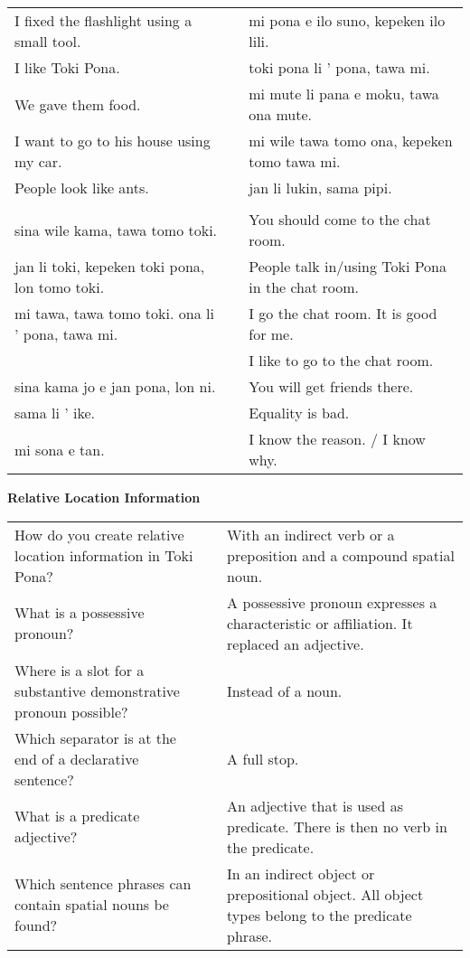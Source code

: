 \begin{supertabular}{p{5,5cm}|ll}
I fixed the flashlight using a small tool.  && mi pona e ilo suno, kepeken ilo lili. \\ %
I like Toki Pona.  && toki pona li ' pona, tawa mi. \\ %
We gave them food.  && mi mute li pana e moku, tawa ona mute. \\ %
I want to go to his house using my car.  && mi wile tawa tomo ona, kepeken tomo tawa mi. \\ %
People look like ants.  && jan li lukin, sama pipi. \\ %
&& \\ %
sina wile kama, tawa tomo toki.  && You should come to the chat room. \\
jan li toki, kepeken toki pona, lon tomo toki.  && People talk in/using Toki Pona in the chat room. \\
mi tawa, tawa tomo toki. ona li ' pona, tawa mi.  && I go the chat room. It is good for me. \\
                                         && I like to go to the chat room. \\ %
sina kama jo e jan pona, lon ni.  && You will get friends there. \\
sama li ' ike. && Equality is bad. \\
mi sona e tan. && I know the reason. / I know why. \\
\end{supertabular} 

\textbf{Relative Location Information} 
\label{'other_prepositions'}

\begin{supertabular}{p{5,5cm}|ll}
How do you create relative location information in Toki Pona? && With an indirect verb or a preposition and a compound spatial noun. \\ %
What is a possessive pronoun? && A possessive pronoun expresses a characteristic or affiliation. It replaced an adjective.  \\ %
Where is a slot for a substantive demonstrative pronoun possible? && Instead of a noun. \\ %
Which separator is at the end of a declarative sentence? && A full stop. \\ %
What is a predicate adjective? && An adjective that is used as predicate. There is then no verb in the predicate. \\ %
Which sentence phrases can contain spatial nouns be found? && In an indirect object or prepositional object. All object types belong to the predicate phrase.  \\ %
\end{supertabular}

